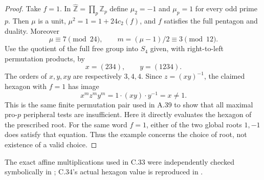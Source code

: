 \begin{proof}
Take $f=1$. In $\widehat{\mathbb Z}=\prod_p\mathbb Z_p$ define
$\mu_2=-1$ and $\mu_p=1$ for every odd prime $p$. Then $\mu$ is a
unit, $\mu^2=1=1+24c_2(f)$, and $f$ satisfies the full pentagon
and duality. Moreover
\[
 \mu\equiv7\pmod{24},\qquad m=(\mu-1)/2\equiv3\pmod{12}.
\]
Use the quotient of the full free group into $S_4$ given, with
right-to-left permutation products, by
\[
                     x=(234),\qquad y=(1234).
\]
The orders of $x,y,xy$ are respectively $3,4,4$. Since
$z=(xy)^{-1}$, the claimed hexagon with $f=1$ has image
\[
             x^m z^m y^m=1\cdot(xy)\cdot y^{-1}=x\ne1.
\]
This is the same finite permutation pair used in A.39 to show that
all maximal pro-$p$ peripheral tests are insufficient. Here it
directly evaluates the hexagon of the prescribed root.
For the same word $f=1$, either of the two global roots $1,-1$
does satisfy that equation. Thus the example concerns the choice
of root, not existence of a valid choice.
\end{proof}

The exact affine multiplications used in C.33 were independently
checked symbolically in
; C.34's actual
hexagon value is reproduced in
.

